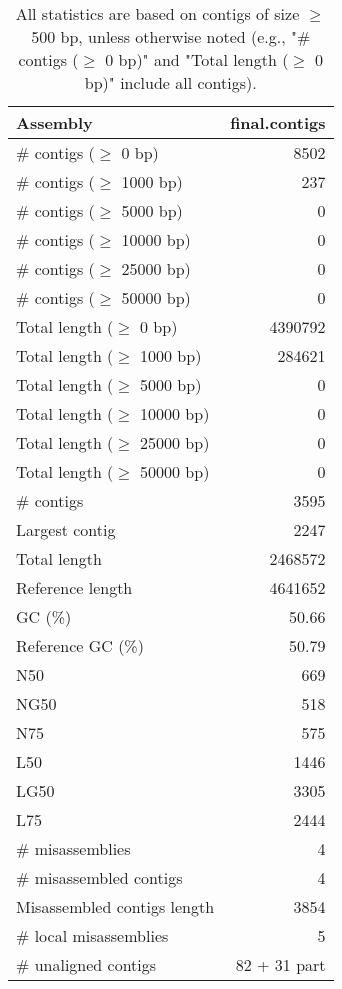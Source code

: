 \documentclass[12pt,a4paper]{article}
\begin{document}
\begin{table}[ht]
\begin{center}
\caption{All statistics are based on contigs of size $\geq$ 500 bp, unless otherwise noted (e.g., "\# contigs ($\geq$ 0 bp)" and "Total length ($\geq$ 0 bp)" include all contigs).}
\begin{tabular}{|l*{1}{|r}|}
\hline
Assembly & final.contigs \\ \hline
\# contigs ($\geq$ 0 bp) & 8502 \\ \hline
\# contigs ($\geq$ 1000 bp) & 237 \\ \hline
\# contigs ($\geq$ 5000 bp) & 0 \\ \hline
\# contigs ($\geq$ 10000 bp) & 0 \\ \hline
\# contigs ($\geq$ 25000 bp) & 0 \\ \hline
\# contigs ($\geq$ 50000 bp) & 0 \\ \hline
Total length ($\geq$ 0 bp) & 4390792 \\ \hline
Total length ($\geq$ 1000 bp) & 284621 \\ \hline
Total length ($\geq$ 5000 bp) & 0 \\ \hline
Total length ($\geq$ 10000 bp) & 0 \\ \hline
Total length ($\geq$ 25000 bp) & 0 \\ \hline
Total length ($\geq$ 50000 bp) & 0 \\ \hline
\# contigs & 3595 \\ \hline
Largest contig & 2247 \\ \hline
Total length & 2468572 \\ \hline
Reference length & 4641652 \\ \hline
GC (\%) & 50.66 \\ \hline
Reference GC (\%) & 50.79 \\ \hline
N50 & 669 \\ \hline
NG50 & 518 \\ \hline
N75 & 575 \\ \hline
L50 & 1446 \\ \hline
LG50 & 3305 \\ \hline
L75 & 2444 \\ \hline
\# misassemblies & 4 \\ \hline
\# misassembled contigs & 4 \\ \hline
Misassembled contigs length & 3854 \\ \hline
\# local misassemblies & 5 \\ \hline
\# unaligned contigs & 82 + 31 part \\ \hline

\end{tabular}
\end{center}
\end{table}
\end{document}

